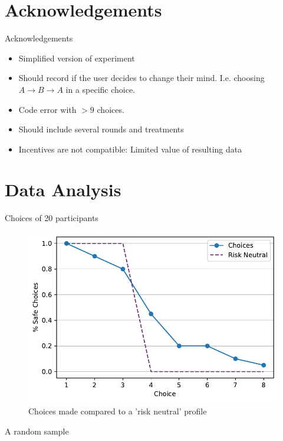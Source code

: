 \documentclass[10pt]{beamer}
\begin{document}
\section{Acknowledgements}
\begin{frame}[fragile]{Acknowledgements}
  \begin{itemize}
    \item Simplified version of experiment
    \item Should record if the user decides to change their mind. I.e. choosing $A \rightarrow B \rightarrow A$ in a specific choice. 
    \item Code error with $> 9$ choices.
    \item Should include several rounds and treatments
    \item Incentives are not compatible: Limited value of resulting data
  \end{itemize}
\end{frame}

\section{Data Analysis}

\begin{frame}{Choices of 20 participants}
  \begin{figure}[H]
  \includegraphics[width=0.9\columnwidth]{graphics/aggregate_plot.pdf}
  \caption{Choices made compared to a 'risk neutral' profile}
\end{figure}
\end{frame}




\begin{frame}{A random sample}
  \resizebox{\textwidth}{!}{
    
  }
\end{frame}
\end{document}

